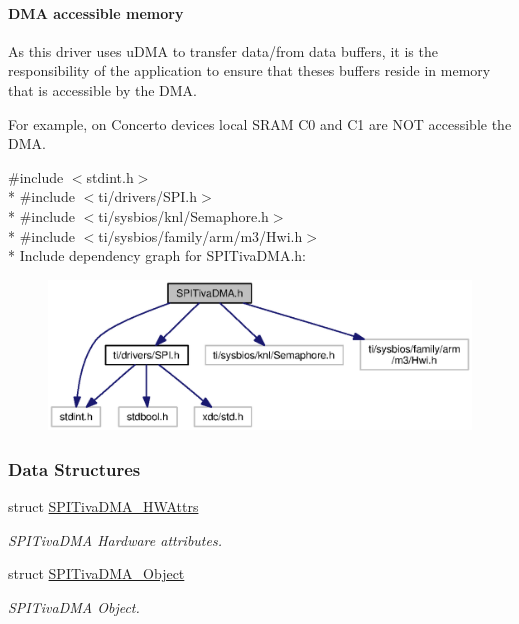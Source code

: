 \paragraph*{D\-M\-A accessible memory}

As this driver uses u\-D\-M\-A to transfer data/from data buffers, it is the responsibility of the application to ensure that theses buffers reside in memory that is accessible by the D\-M\-A.

For example, on Concerto devices local S\-R\-A\-M C0 and C1 are N\-O\-T accessible the D\-M\-A. 

{\ttfamily \#include $<$stdint.\-h$>$}\\*
{\ttfamily \#include $<$ti/drivers/\-S\-P\-I.\-h$>$}\\*
{\ttfamily \#include $<$ti/sysbios/knl/\-Semaphore.\-h$>$}\\*
{\ttfamily \#include $<$ti/sysbios/family/arm/m3/\-Hwi.\-h$>$}\\*
Include dependency graph for S\-P\-I\-Tiva\-D\-M\-A.\-h\-:
\nopagebreak
\begin{figure}[H]
\begin{center}
\leavevmode
\includegraphics[width=350pt]{_s_p_i_tiva_d_m_a_8h__incl}
\end{center}
\end{figure}
\subsubsection*{Data Structures}
\begin{DoxyCompactItemize}
\item 
struct \hyperlink{struct_s_p_i_tiva_d_m_a___h_w_attrs}{S\-P\-I\-Tiva\-D\-M\-A\-\_\-\-H\-W\-Attrs}
\begin{DoxyCompactList}\small\item\em S\-P\-I\-Tiva\-D\-M\-A Hardware attributes. \end{DoxyCompactList}\item 
struct \hyperlink{struct_s_p_i_tiva_d_m_a___object}{S\-P\-I\-Tiva\-D\-M\-A\-\_\-\-Object}
\begin{DoxyCompactList}\small\item\em S\-P\-I\-Tiva\-D\-M\-A Object. \end{DoxyCompactList}\end{DoxyCompactItemize}
